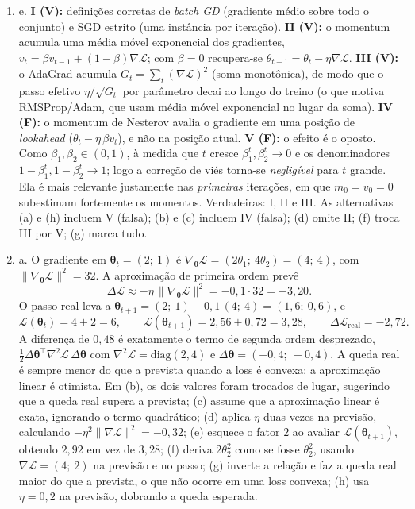 \documentclass{dlproblemset}
\begin{document}
\begin{enumerate}[1)]
    \item e. \textbf{I (V):} definições corretas de \textit{batch GD} (gradiente médio sobre todo o conjunto) e SGD estrito (uma instância por iteração). \textbf{II (V):} o momentum acumula uma média móvel exponencial dos gradientes, $v_t = \beta v_{t-1} + (1-\beta)\nabla\mathcal{L}$; com $\beta = 0$ recupera-se $\theta_{t+1} = \theta_t - \eta\nabla\mathcal{L}$. \textbf{III (V):} o AdaGrad acumula $G_t = \sum_t (\nabla\mathcal{L})^2$ (soma monotônica), de modo que o passo efetivo $\eta/\sqrt{G_t}$ por parâmetro decai ao longo do treino (o que motiva RMSProp/Adam, que usam média móvel exponencial no lugar da soma). \textbf{IV (F):} o momentum de Nesterov avalia o gradiente em uma posição de \textit{lookahead} ($\theta_t - \eta\,\beta v_t$), e não na posição atual. \textbf{V (F):} o efeito é o oposto. Como $\beta_1, \beta_2 \in (0,1)$, à medida que $t$ cresce $\beta_1^{t}, \beta_2^{t} \to 0$ e os denominadores $1-\beta_1^{t}, 1-\beta_2^{t} \to 1$; logo a correção de viés torna-se \emph{negligível} para $t$ grande. Ela é mais relevante justamente nas \emph{primeiras} iterações, em que $m_0 = v_0 = 0$ subestimam fortemente os momentos. Verdadeiras: I, II e III. As alternativas (a) e (h) incluem V (falsa); (b) e (c) incluem IV (falsa); (d) omite II; (f) troca III por V; (g) marca tudo.

    \item a. O gradiente em $\boldsymbol{\theta}_t = (2;\ 1)$ é $\nabla_{\boldsymbol{\theta}}\mathcal{L} = (2\theta_1;\ 4\theta_2) = (4;\ 4)$, com $\|\nabla_{\boldsymbol{\theta}}\mathcal{L}\|^2 = 32$. A aproximação de primeira ordem prevê
    \[
    \Delta\mathcal{L} \approx -\eta\,\|\nabla_{\boldsymbol{\theta}}\mathcal{L}\|^2 = -0{,}1 \cdot 32 = -3{,}20 .
    \]
    O passo real leva a $\boldsymbol{\theta}_{t+1} = (2;\ 1) - 0{,}1\,(4;\ 4) = (1{,}6;\ 0{,}6)$, e
    \[
    \mathcal{L}(\boldsymbol{\theta}_t) = 4 + 2 = 6, \qquad
    \mathcal{L}(\boldsymbol{\theta}_{t+1}) = 2{,}56 + 0{,}72 = 3{,}28, \qquad
    \Delta\mathcal{L}_{\text{real}} = -2{,}72 .
    \]
    A diferença de $0{,}48$ é exatamente o termo de segunda ordem desprezado, $\tfrac{1}{2}\Delta\boldsymbol{\theta}^{\top}\nabla^2\mathcal{L}\,\Delta\boldsymbol{\theta}$ com $\nabla^2\mathcal{L} = \mathrm{diag}(2, 4)$ e $\Delta\boldsymbol{\theta} = (-0{,}4;\ -0{,}4)$. A queda real é sempre menor do que a prevista quando a loss é convexa: a aproximação linear é otimista. Em (b), os dois valores foram trocados de lugar, sugerindo que a queda real supera a prevista; (c) assume que a aproximação linear é exata, ignorando o termo quadrático; (d) aplica $\eta$ duas vezes na previsão, calculando $-\eta^2\|\nabla\mathcal{L}\|^2 = -0{,}32$; (e) esquece o fator $2$ ao avaliar $\mathcal{L}(\boldsymbol{\theta}_{t+1})$, obtendo $2{,}92$ em vez de $3{,}28$; (f) deriva $2\theta_2^2$ como se fosse $\theta_2^2$, usando $\nabla\mathcal{L} = (4;\ 2)$ na previsão e no passo; (g) inverte a relação e faz a queda real maior do que a prevista, o que não ocorre em uma loss convexa; (h) usa $\eta = 0{,}2$ na previsão, dobrando a queda esperada.


\end{enumerate}
\end{document}
